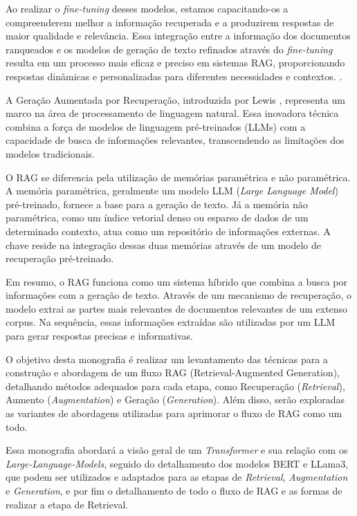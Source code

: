 Ao realizar o \textit{fine-tuning} desses modelos, estamos capacitando-os a compreenderem melhor a informação recuperada e a produzirem respostas de maior qualidade e relevância. Essa integração entre a informação dos documentos ranqueados e os modelos de geração de texto refinados através do \textit{fine-tuning} resulta em um processo mais eficaz e preciso em sistemas RAG, proporcionando respostas dinâmicas e personalizadas para diferentes necessidades e contextos. \cite{gao2024retrievalaugmentedgenerationlargelanguage}.

A Geração Aumentada por Recuperação, introduzida por Lewis \cite{lewis2021retrievalaugmented}, representa um marco na área de processamento de linguagem natural. Essa inovadora técnica combina a força de modelos de linguagem pré-treinados (LLMs) com a capacidade de busca de informações relevantes, transcendendo as limitações dos modelos tradicionais.

O RAG se diferencia pela utilização de memórias paramétrica e não paramétrica. A memória paramétrica, geralmente um modelo LLM (\textit{Large Language Model}) pré-treinado, fornece a base para a geração de texto. Já a memória não paramétrica, como um índice vetorial denso ou esparso de dados de um determinado contexto, atua como um repositório de informações externas. A chave reside na integração dessas duas memórias através de um modelo de recuperação pré-treinado.

Em resumo, o RAG funciona como um sistema híbrido que combina a busca por informações com a geração de texto. Através de um mecanismo de recuperação, o modelo extrai as partes mais relevantes de documentos relevantes de um extenso corpus. Na sequência, essas informações extraídas são utilizadas por um LLM para gerar respostas precisas e informativas.

O objetivo desta monografia é realizar um levantamento das técnicas para a construção e abordagem de um fluxo RAG (Retrieval-Augmented Generation), detalhando métodos adequados para cada etapa, como Recuperação (\textit{Retrieval}), Aumento (\textit{Augmentation}) e Geração (\textit{Generation}). Além disso, serão exploradas as variantes de abordagens utilizadas para aprimorar o fluxo de RAG como um todo.

Essa monografia abordará a visão geral de um \textit{Transformer} e sua relação com os \textit{Large-Language-Models}, seguido do detalhamento dos modelos BERT e LLama3, que podem ser utilizados e adaptados para as etapas de \textit{Retrieval}, \textit{Augmentation} e \textit{Generation}, e por fim o detalhamento de todo o fluxo de RAG e as formas de realizar a etapa de Retrieval.